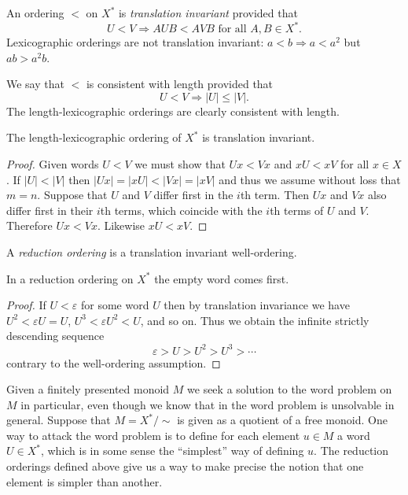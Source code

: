 \begin{defn} An ordering $<$ on $X^*$ is \emph{translation invariant} provided
    that \[U < V \Rightarrow AUB < AVB \text{ for all } A,B\in X^*.\]
    Lexicographic orderings are not translation invariant: $a < b \Rightarrow a
    < a^2$ but $ab > a^2b$.

    We say that $<$ is consistent with length provided that \[U < V \Rightarrow
    |U| \le |V|.\] The length-lexicographic orderings are clearly consistent
    with length.
\end{defn}

\begin{prop} The length-lexicographic ordering of $X^*$ is translation invariant.
\end{prop}
\begin{proof} Given words $U < V$ we must show that $Ux < Vx$ and $xU < xV$ for
    all $x\in X$. If $|U| < |V|$ then $|Ux|=|xU| < |Vx| = |xV|$ and thus we
    assume without loss that $m=n$. Suppose that $U$ and $V$ differ first in
    the $i$th term. Then $Ux$ and $Vx$ also differ first in their $i$th terms,
    which coincide with the $i$th terms of $U$ and $V$. Therefore $Ux < Vx$.
    Likewise $xU < xV$.
\end{proof}

\begin{defn} A \emph{reduction ordering} is a translation invariant
    well-ordering.
\end{defn}

\begin{prop} In a reduction ordering on $X^*$ the empty word comes first.
\end{prop}
\begin{proof} If $U < \varepsilon$ for some word $U$ then by translation
    invariance we have $U^2 < \varepsilon U = U$, $U^3 < \varepsilon U^2 < U$,
    and so on. Thus we obtain the infinite strictly descending sequence
    \[\varepsilon > U > U^2 > U^3 > \cdots\] contrary to the well-ordering
    assumption. \end{proof}

\begin{ap} Given a finitely presented monoid $M$ we seek a solution to the word
    problem on $M$ in particular, even though we know that in the word problem
    is unsolvable in general. Suppose that $M = X^*/\sim$ is given as a
    quotient of a free monoid. One way to attack the word problem is to define
    for each element $u\in M$ a word $U\in X^*$, which is in some sense the
    ``simplest'' way of defining $u$. The reduction orderings defined above
    give us a way to make precise the notion that one element is simpler than
    another.
\end{ap}

